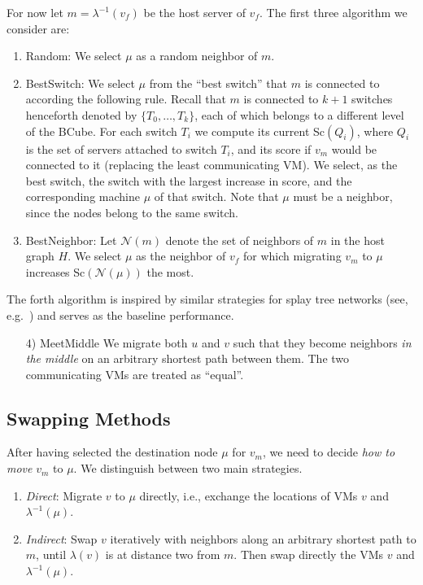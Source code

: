 \documentclass[conference]{IEEEtran}
\begin{document}
For now let $m= \lambda^{-1}(v_f)$ be the host server of $v_f$.  The first three algorithm we consider are:
\begin{enumerate}
\item {\sc Random:} We select $\mu$ as a random neighbor of $m$.
\item {\sc BestSwitch:} We select $\mu$ from the ``best switch'' that $m$ is connected to according the following rule.
Recall that $m$ is connected to $k+1$
switches henceforth denoted by $\{T_0,\ldots,T_k\}$, each of which belongs to a different level of the BCube. For each switch $T_i$ we compute its
current {\sc Sc}$(Q_i)$, where $Q_i$ is the set of servers attached to switch $T_i$, and its score if $v_m$ would be connected to it (replacing the least communicating VM).
We select, as the best switch, the switch with the largest increase in score, and the corresponding machine $\mu$ of that switch.
Note that $\mu$  must be a neighbor, since the nodes belong to the same switch.
\item {\sc BestNeighbor:} Let $\mathcal{N}(m)$ denote the set of neighbors of $m$ in the host graph $H$. We select $\mu$ as the neighbor of $v_f$ for which
migrating $v_m$ to  $\mu$ increases {\sc Sc}$(\mathcal{N}(\mu))$ the most.
\end{enumerate}

The forth algorithm is inspired by similar strategies for splay tree networks (see, e.g.~\cite{ipdps13}) and serves as the
baseline performance.
\begin{enumerate}
\item[4)]{\sc MeetMiddle}
 We migrate both $u$ and $v$ such that they become neighbors \emph{in the middle} on an arbitrary shortest path between them.
 The two communicating VMs are treated as ``equal''.
\end{enumerate}




\subsection{Swapping Methods}

After having selected the destination node $\mu$ for $v_m$, we need to decide \emph{how to move} $v_m$ to $\mu$.
We distinguish between two main strategies.
\begin{enumerate}
	\item \emph{Direct}: Migrate $v$ to $\mu$ directly, i.e., exchange the locations of VMs $v$ and $\lambda^{-1}(\mu)$.

	\item \emph {Indirect}: Swap $v$ iteratively with neighbors along an arbitrary shortest path to $m$, until $\lambda(v)$ is at distance
	two from $m$. Then swap directly the VMs $v$ and $\lambda^{-1}(\mu)$.
\end{enumerate}
\end{document}
